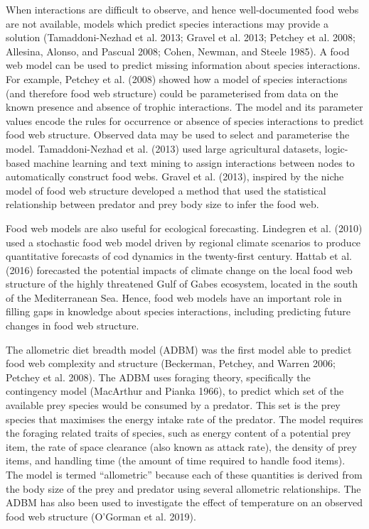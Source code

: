 \documentclass{article}
\begin{document}
When interactions are difficult to observe, and hence well-documented
food webs are not available, models which predict species interactions
may provide a solution (Tamaddoni-Nezhad et al. 2013; Gravel et al.
2013; Petchey et al. 2008; Allesina, Alonso, and Pascual 2008; Cohen,
Newman, and Steele 1985). A food web model can be used to predict
missing information about species interactions. For example, Petchey et
al. (2008) showed how a model of species interactions (and therefore
food web structure) could be parameterised from data on the known
presence and absence of trophic interactions. The model and its
parameter values encode the rules for occurrence or absence of species
interactions to predict food web structure. Observed data may be used to
select and parameterise the model. Tamaddoni-Nezhad et al. (2013) used
large agricultural datasets, logic-based machine learning and text
mining to assign interactions between nodes to automatically construct
food webs. Gravel et al. (2013), inspired by the niche model of food web
structure developed a method that used the statistical relationship
between predator and prey body size to infer the food web.

Food web models are also useful for ecological forecasting. Lindegren et
al. (2010) used a stochastic food web model driven by regional climate
scenarios to produce quantitative forecasts of cod dynamics in the
twenty-first century. Hattab et al. (2016) forecasted the potential
impacts of climate change on the local food web structure of the highly
threatened Gulf of Gabes ecosystem, located in the south of the
Mediterranean Sea. Hence, food web models have an important role in
filling gaps in knowledge about species interactions, including
predicting future changes in food web structure.

The allometric diet breadth model (ADBM) was the first model able to
predict food web complexity and structure (Beckerman, Petchey, and
Warren 2006; Petchey et al. 2008). The ADBM uses foraging theory,
specifically the contingency model (MacArthur and Pianka 1966), to
predict which set of the available prey species would be consumed by a
predator. This set is the prey species that maximises the energy intake
rate of the predator. The model requires the foraging related traits of
species, such as energy content of a potential prey item, the rate of
space clearance (also known as attack rate), the density of prey items,
and handling time (the amount of time required to handle food items).
The model is termed ``allometric'' because each of these quantities is
derived from the body size of the prey and predator using several
allometric relationships. The ADBM has also been used to investigate the
effect of temperature on an observed food web structure (O'Gorman et al.
2019).
\end{document}
